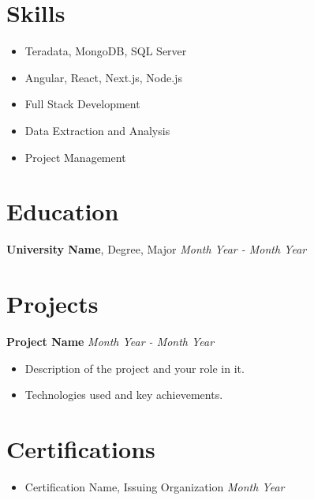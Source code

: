 \documentclass[a4paper,10pt]{article}
\begin{document}
\section*{Skills}
\begin{multicols}{2}
    \begin{itemize}[label=--]
        \item Teradata, MongoDB, SQL Server
        \item Angular, React, Next.js, Node.js
        \item Full Stack Development
        \item Data Extraction and Analysis
        \item Project Management
    \end{itemize}
\end{multicols}

\section*{Education}

\textbf{University Name}, Degree, Major \hfill \textit{Month Year - Month Year}

\section*{Projects}

\textbf{Project Name} \hfill \textit{Month Year - Month Year}
\begin{itemize}[label=--]
    \item Description of the project and your role in it.
    \item Technologies used and key achievements.
\end{itemize}

\section*{Certifications}
\begin{itemize}[label=--]
    \item Certification Name, Issuing Organization \hfill \textit{Month Year}
\end{itemize}
\end{document}
